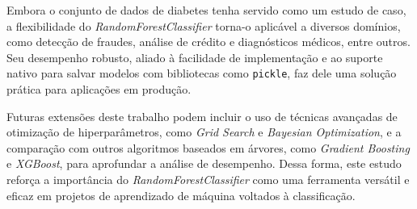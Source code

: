 \documentclass[a4paper,12pt]{article}
\begin{document}
Embora o conjunto de dados de diabetes tenha servido como um estudo de caso, a flexibilidade do \textit{RandomForestClassifier} torna-o aplicável a diversos domínios, como detecção de fraudes, análise de crédito e diagnósticos médicos, entre outros. Seu desempenho robusto, aliado à facilidade de implementação e ao suporte nativo para salvar modelos com bibliotecas como \texttt{pickle}, faz dele uma solução prática para aplicações em produção.

Futuras extensões deste trabalho podem incluir o uso de técnicas avançadas de otimização de hiperparâmetros, como \textit{Grid Search} e \textit{Bayesian Optimization}, e a comparação com outros algoritmos baseados em árvores, como \textit{Gradient Boosting} e \textit{XGBoost}, para aprofundar a análise de desempenho. Dessa forma, este estudo reforça a importância do \textit{RandomForestClassifier} como uma ferramenta versátil e eficaz em projetos de aprendizado de máquina voltados à classificação.
\end{document}
